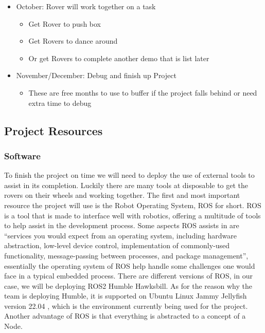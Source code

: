 \documentclass[conference]{IEEEtran}
\begin{document}
\begin{itemize}
\begin{itemize}
	\end{itemize}
	\item October: Rover will work together on a task
	\begin{itemize}
		\item Get Rover to push box
		\item Get Rovers to dance around
		\item Or get Rovers to complete another demo that is list later
	\end{itemize}
	\item November/December: Debug and finish up Project
	\begin{itemize}
		\item These are free months to use to buffer if the project falls behind or need extra time to debug
	\end{itemize}
\end{itemize}
\subsection{Project Resources}
\subsubsection{Software}
To finish the project on time we will need to deploy the use of external tools to assist in its completion. Luckily there are many tools at disposable to get the rovers on their wheels and working together. The first and most important resource the project will use is the Robot Operating System, ROS for short. ROS is a tool that is made to interface well with robotics, offering a multitude of tools to help assist in the development process. Some aspects ROS assists in are “services you would expect from an operating system, including hardware abstraction, low-level device control, implementation of commonly-used functionality, message-passing between processes, and package management”\cite{RN200}, essentially the operating system of ROS help handle some challenges one would face in a typical embedded process. There are different versions of ROS, in our case, we will be deploying ROS2 Humble Hawksbill. As for the reason why the team is deploying Humble, it is supported on Ubuntu Linux Jammy Jellyfish version 22.04 \cite{RN201}, which is the environment currently being used for the project. Another advantage of ROS is that everything is abstracted to a concept of a Node.
\end{document}
